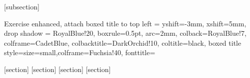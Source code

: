 

[subsection]

    {Exercise}%
    {enhanced, %
    attach boxed title to top left = {yshift=-3mm, xshift=5mm},
    drop shadow = RoyalBlue!20,
    boxrule=0.5pt,
    arc=2mm,
    colback=RoyalBlue!7, colframe=CadetBlue, colbacktitle=DarkOrchid!10, coltitle=black,
    boxed title style={size=small,colframe=Fuchsia!40},
    fonttitle=\bfseries
    }%
{}

\newenvironment{exercise}{\begin{exer}{}{}\vspace{2mm}}{\end{exer}}

\newenvironment{specialexercise}{\begin{exer}%
    [title = $(*)$ Exercise \theexercount,%
    drop shadow = Emerald!30,%
    boxrule=0.75pt,%
    colback=SpringGreen!19, colframe=PineGreen!70,%
    colbacktitle=gray!16, 
    boxed title style ={colframe=black!70}]{}{}\vspace{2mm}}{\end{exer}}


[section]
[section]
[section]
[section]

\def\definitionautorefname{Definition}
\def\propositionautorefname{Proposition}
\def\theoremautorefname{Theorem}
\def\corollaryautorefname{Corollary}

\renewcommand{\subsectionautorefname}{Section}





